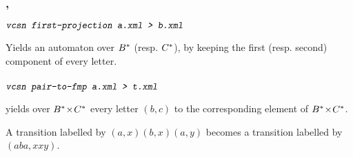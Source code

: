 \subsubsection{, }
\begin{SwClCmd}
\begin{shell}
$ \textsl{\texttt{vcsn first-projection a.xml > b.xml}}
$
\end{shell}%
\end{SwClCmd}%
\begin{SwClTxt}
    Yields an automaton over ${{B}^{*}}$ (resp. ${{C}^{*}}$), by keeping the first 
    (resp. second) component of every letter.
\end{SwClTxt}%

% 
% 


\subsubsection{}

\begin{SwClCmd}
\begin{shell}
$ \textsl{\texttt{vcsn pair-to-fmp a.xml > t.xml}}
$
\end{shell}%
\end{SwClCmd}%
\begin{SwClTxt}
    yields \fmpt over ${{B}^{*}}\! \times \!{{C}^{*}}$ every letter $(b,c)$ to the 
    corresponding element of ${{B}^{*}}\! \times \!{{C}^{*}}$.
\end{SwClTxt}%

\Spec 
A transition 
labelled by $(a,x)(b,x)(a,y)$ becomes a transition labelled by 
$(aba,xxy)$.


% 
% 
% 
% 
% 
% 
\endinput
